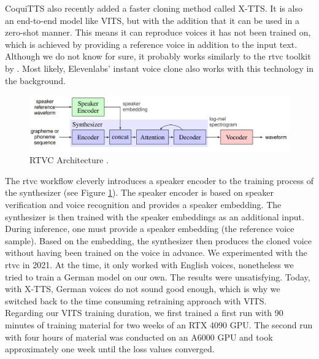 \documentclass[
  a4paper,  %
  twoside,  %
  bibliography=totoc,
  headsepline,
  cleardoublepage=empty,
  parskip=half,
  draft=false
]{scrbook}
\begin{document}
CoquiTTS also recently added a faster cloning method called X-TTS. It is also an end-to-end model like VITS, but with the addition that it can be used in a zero-shot manner. This means it can reproduce voices it has not been trained on, which is achieved by providing a reference voice in addition to the input text. Although we do not know for sure, it probably works similarly to the \gls{rtvc} toolkit by \citeauthor{jemineRealTimeVoiceCloning2019}. Most likely, Elevenlabs' instant voice clone also works with this technology in the background.

\begin{figure}[h]
  \centering
  \includegraphics[width=1\textwidth]{./graphics/rtvc.png}
  \caption{RTVC Architecture \cite{jemineRealTimeVoiceCloning2019}.}
  \label{fig:rtvc-arch}
\end{figure}

The \gls{rtvc} workflow cleverly introduces a speaker encoder to the training process of the synthesizer (see Figure \ref{fig:rtvc-arch}). The speaker encoder is based on speaker verification and voice recognition and provides a speaker embedding. The synthesizer is then trained with the speaker embeddings as an additional input. During inference, one must provide a speaker embedding (the reference voice sample). Based on the embedding, the synthesizer then produces the cloned voice without having been trained on the voice in advance. We experimented with the \gls{rtvc} in 2021. At the time, it only worked with English voices, nonetheless we tried to train a German model on our own. The results were unsatisfying. Today, with X-TTS, German voices do not sound good enough, which is why we switched back to the time consuming retraining approach with VITS. \\
Regarding our VITS training duration, we first trained a first run with 90 minutes of training material for two weeks of an RTX 4090 GPU. The second run with four hours of material was conducted on an A6000 GPU and took approximately one week until the loss values converged. 
\end{document}
